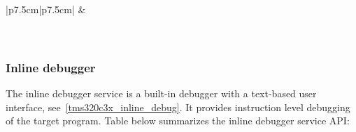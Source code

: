 \begin{center}
\begin{supertabular}{|p{7.5cm}|p{7.5cm}|}
		\hline
		 & \\
		\\
		\\
		\hline
	\end{supertabular}
\end{center}

\newpage
\subsubsection{Inline debugger}
\label{tms320c3x_inline_debugger}

The inline debugger service is a built-in debugger with a text-based user interface, see~\ref{tms320c3x_inline_debug}. It provides instruction level debugging of the target program.
\noindent Table below summarizes the inline debugger service API:

